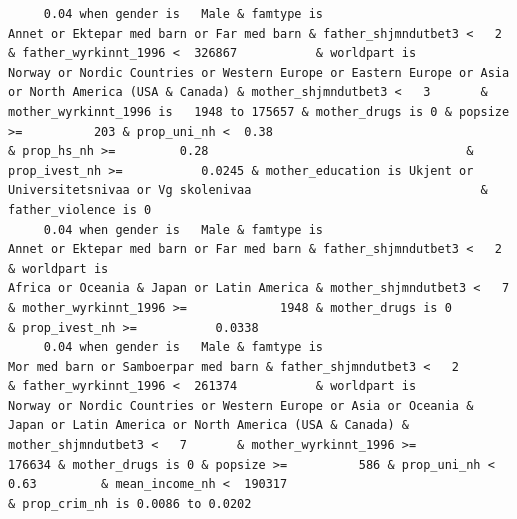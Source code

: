 \documentclass[
  letterpaper,
  DIV=11,
  numbers=noendperiod]{scrreprt}
\begin{document}
\begin{verbatim}
     0.04 when gender is   Male & famtype is                        Annet or Ektepar med barn or Far med barn & father_shjmndutbet3 <   2       & father_wyrkinnt_1996 <  326867           & worldpart is                              Norway or Nordic Countries or Western Europe or Eastern Europe or Asia or North America (USA & Canada) & mother_shjmndutbet3 <   3       & mother_wyrkinnt_1996 is   1948 to 175657 & mother_drugs is 0 & popsize >=          203 & prop_uni_nh <  0.38                                              & prop_hs_nh >=         0.28                                    & prop_ivest_nh >=           0.0245 & mother_education is Ukjent or Universitetsnivaa or Vg skolenivaa                                & father_violence is 0                                                                                                               
     0.04 when gender is   Male & famtype is                        Annet or Ektepar med barn or Far med barn & father_shjmndutbet3 <   2                                                  & worldpart is                                                                                          Africa or Oceania & Japan or Latin America & mother_shjmndutbet3 <   7       & mother_wyrkinnt_1996 >=             1948 & mother_drugs is 0                                                                                                                                                              & prop_ivest_nh >=           0.0338                                                                                                                                                                                                                                        
     0.04 when gender is   Male & famtype is                              Mor med barn or Samboerpar med barn & father_shjmndutbet3 <   2       & father_wyrkinnt_1996 <  261374           & worldpart is            Norway or Nordic Countries or Western Europe or Asia or Oceania & Japan or Latin America or North America (USA & Canada) & mother_shjmndutbet3 <   7       & mother_wyrkinnt_1996 >=           176634 & mother_drugs is 0 & popsize >=          586 & prop_uni_nh <  0.63         & mean_income_nh <  190317                                        & prop_crim_nh is 0.0086 to 0.0202                                                                                                                                                                                                                                                                            

\end{verbatim}
\end{document}
